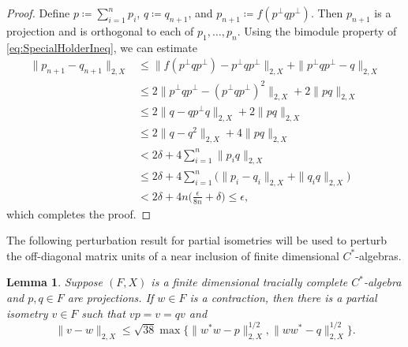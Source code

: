 \documentclass[a4paper,11pt]{amsart}
\newtheorem{lemma}[theorem]{Lemma}
\theoremstyle{definition}
\numberwithin{equation}{section}
\numberwithin{theorem}{section}
\begin{document}
\begin{proof}
	Define $p \coloneqq \sum_{i=1}^n p_i$, $q \coloneqq q_{n+1}$, and $p_{n+1} \coloneqq f(p^\perp q p^\perp)$.  Then $p_{n+1}$ is a projection and is orthogonal to each of $p_1, \ldots, p_n$.  Using the bimodule property of \eqref{eq:SpecialHolderIneq}, we can estimate
	\begin{equation}\begin{split}
		\|p_{n+1} - q_{n+1}\|_{2, X}
		&\leq \|f(p^\perp q p^\perp) - p^\perp q p^\perp\|_{2, X} + \|p^\perp q p^\perp - q\|_{2, X}  \\
		&\leq 2 \| p^\perp q p^\perp - (p^\perp q p^\perp)^2 \|_{2, X} + 2 \|p q\|_{2, X} \\
		&\leq 2 \|  q  - qp^\perp q \|_{2, X} + 2 \|p q\|_{2, X} \\
		&\leq 2 \|q - q^2\|_{2, X} + 4 \|pq\|_{2, X} \\
		&< 2 \delta + 4 \sum_{i=1}^n \|p_i q\|_{2, X} \\
		&\leq 2 \delta + 4 \sum_{i=1}^n \big( \|p_i - q_i\|_{2, X} + \|q_iq\|_{2, X} \big) \\
		&< 2 \delta + 4n\Big(\frac{\epsilon}{8n} + \delta \Big) \leq \epsilon,
	\end{split}\end{equation}
    which completes the proof.
\end{proof}

The following perturbation result for partial isometries will be used to perturb the off-diagonal matrix units of a near inclusion of finite dimensional $C^*$-algebras.

\begin{lemma}
	\label{lem:partial-isometry}
	Suppose $(F, X)$ is a finite dimensional tracially complete $C^*$-algebra and $p, q \in F$ are projections.  If $w \in F$ is a contraction, then there is a partial isometry $v \in F$ such that $vp = v = qv$ and 	
	\begin{equation}
		\|v - w\|_{2, X} \leq \sqrt{38} \max \big\{\|w^*w - p\|_{2, X}^{1/2}, \|ww^* - q\|_{2, X}^{1/2} \big\}.
	\end{equation}
\end{lemma}
\end{document}
